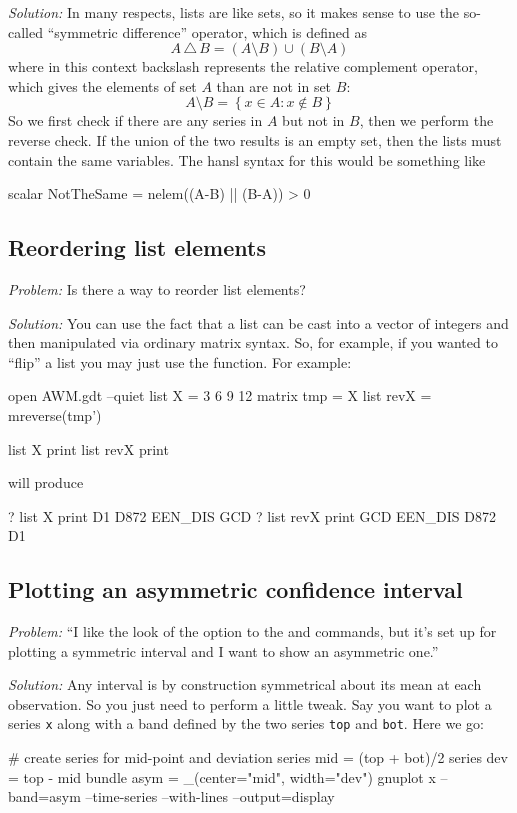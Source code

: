\emph{Solution:} In many respects, lists are like sets, so it makes
sense to use the so-called ``symmetric difference'' operator, which is
defined as
\[
A\,\triangle\,B = (A \setminus B) \cup (B \setminus A)
\]
where in this context backslash represents the relative complement
operator, which gives the elements of set $A$ than are not in set $B$:
\[
A \setminus B = \left\{ x \in A : x \not \in B \right\}
\]
So we first check if there are any series in $A$ but not in $B$, then
we perform the reverse check. If the union of the two results is an
empty set, then the lists must contain the same variables. The hansl
syntax for this would be something like
\begin{code}
scalar NotTheSame = nelem((A-B) || (B-A)) > 0
\end{code}

\subsection{Reordering list elements}

\emph{Problem:} Is there a way to reorder list elements?

\emph{Solution:} You can use the fact that a list can be cast into
a vector of integers and then manipulated via ordinary matrix
syntax. So, for example, if you wanted to ``flip'' a list you may
just use the  function. For example:
\begin{code}
open AWM.gdt --quiet
list X = 3 6 9 12
matrix tmp = X
list revX = mreverse(tmp')

list X print
list revX print
\end{code}
will produce
\begin{code}
? list X print
D1 D872 EEN_DIS GCD
? list revX print
GCD EEN_DIS D872 D1
\end{code}

\subsection{Plotting an asymmetric confidence interval}

\emph{Problem:} ``I like the look of the  option to the
 and  commands, but it's set up for plotting a
symmetric interval and I want to show an asymmetric one.''

\emph{Solution:} Any interval is by construction symmetrical about its
mean at each observation. So you just need to perform a little
tweak. Say you want to plot a series \texttt{x} along with a band
defined by the two series \texttt{top} and \texttt{bot}. Here we go:
\begin{code}
# create series for mid-point and deviation
series mid = (top + bot)/2
series dev = top - mid
bundle asym = _(center="mid", width="dev")
gnuplot x --band=asym --time-series --with-lines --output=display
\end{code}

